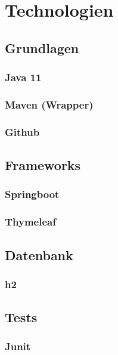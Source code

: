 

\section{Technologien}
\label{Technologien}


\subsection{Grundlagen}

\subsubsection{Java 11}

\subsubsection{Maven (Wrapper)}

\subsubsection{Github}


\subsection{Frameworks}

\subsubsection{Springboot}



\subsubsection{Thymeleaf}


\subsection{Datenbank}
\subsubsection{h2}



\subsection{Tests}
\subsubsection{Junit}

